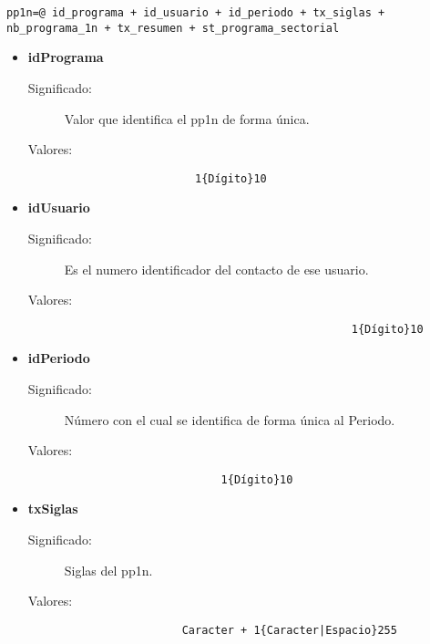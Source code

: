 \begin{lstlisting}
pp1n=@ id_programa + id_usuario + id_periodo + tx_siglas + nb_programa_1n + tx_resumen + st_programa_sectorial
\end{lstlisting}
	\begin{itemize}
		\item \textbf{idPrograma}
			\begin{description}
				\item [Significado:] Valor que identifica el pp1n de forma única.
				\item [Valores:]{
				  \begin{lstlisting} 
				    1{Dígito}10 
				  \end{lstlisting}}
			\end{description}
		\item \textbf{idUsuario}
			\begin{description}
			  \item [Significado:] Es el numero identificador del contacto de ese usuario.
			  \item [Valores:]{\begin{lstlisting}
                                            1{Dígito}10
                                         \end{lstlisting}} 
			\end{description}
		\item	\textbf{idPeriodo}
		\begin{description}
			\item [Significado:] Número con el cual se identifica de forma única al Periodo.
			\item [Valores:]{\begin{lstlisting}
					    1{Dígito}10
					 \end{lstlisting}}
		\end{description}
		\item \textbf{txSiglas}
			\begin{description}
				\item [Significado:] Siglas del pp1n.
				\item [Valores:]{
				  \begin{lstlisting}
				  Caracter + 1{Caracter|Espacio}255
				  \end{lstlisting}}

\end{description}
\end{itemize}
